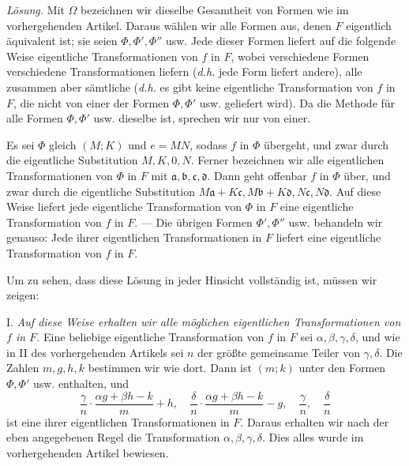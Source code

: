 \textit{Lösung.} Mit $\Omega$ bezeichnen wir dieselbe Gesamtheit von Formen wie im vorhergehenden Artikel. Daraus wählen wir alle Formen aus, denen $F$ eigentlich äquivalent ist; sie seien $\Phi,\Phi',\Phi''$ usw. Jede dieser Formen liefert auf die folgende Weise eigentliche Transformationen von $f$ in $F$, wobei verschiedene Formen verschiedene Transformationen liefern (\textit{d.h.} jede Form liefert andere), alle zusammen aber sämtliche (\textit{d.h.} es gibt keine eigentliche Transformation von $f$ in $F$, die nicht von einer der Formen $\Phi,\Phi'$ usw. geliefert wird). Da die Methode für alle Formen $\Phi,\Phi'$ usw. dieselbe ist, sprechen wir nur von einer.

Es sei $\Phi$ gleich $(M;K)$ und $e=MN$, sodass $f$ in $\Phi$ übergeht, und zwar durch die eigentliche Substitution $M,K,0,N$. Ferner bezeichnen wir alle eigentlichen Transformationen von $\Phi$ in $F$ mit $\mathfrak{a},\mathfrak{b},\mathfrak{c},\mathfrak{d}$. Dann geht offenbar $f$ in $\Phi$ über, und zwar durch die eigentliche Substitution $M\mathfrak{a}+K\mathfrak{c},M\mathfrak{b}+K\mathfrak{d},N\mathfrak{c},N\mathfrak{d}$. Auf diese Weise liefert jede eigentliche Transformation von $\Phi$ in $F$ eine eigentliche Transformation von $f$ in $F$. --- Die übrigen Formen $\Phi',\Phi''$ usw. behandeln wir genauso: Jede ihrer eigentlichen Transformationen in $F$ liefert eine eigentliche Transformation von $f$ in $F$.

Um zu sehen, dass diese Lösung in jeder Hinsicht vollständig ist, müssen wir zeigen:

I. \textit{Auf diese Weise erhalten wir alle möglichen eigentlichen Transformationen von $f$ in $F$.} Eine beliebige eigentliche Transformation von $f$ in $F$ sei $\alpha,\beta,\gamma,\delta$, und wie in II des vorhergehenden Artikels sei $n$ der größte gemeinsame Teiler von $\gamma,\delta$. Die Zahlen $m,g,h,k$ bestimmen wir wie dort. Dann ist $(m;k)$ unter den Formen $\Phi,\Phi'$ usw. enthalten, und
\[
\frac{\gamma}{n}\cdot\frac{\alpha g+\beta h-k}{m}+h,\quad
\frac{\delta}{n}\cdot\frac{\alpha g+\beta h-k}{m}-g,\quad
\frac{\gamma}{n},\quad\frac{\delta}{n}
\]
ist eine ihrer eigentlichen Transformationen in $F$. Daraus erhalten wir nach der eben angegebenen Regel die Transformation $\alpha,\beta,\gamma,\delta$. Dies alles wurde im vorhergehenden Artikel bewiesen.

